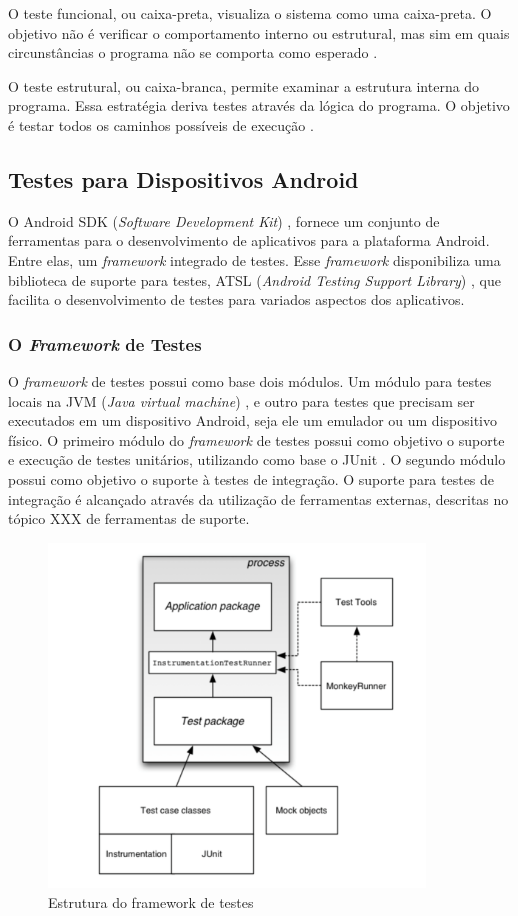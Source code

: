 O teste funcional, ou caixa-preta, visualiza o sistema como uma caixa-preta. O
objetivo não é verificar o comportamento interno ou estrutural, mas sim em
quais circunstâncias o programa não se comporta como esperado \cite{myers2011}.

O teste estrutural, ou caixa-branca, permite examinar a estrutura interna do
programa. Essa estratégia deriva testes através da lógica do programa. O
objetivo é testar todos os caminhos possíveis de execução \cite{myers2011}.

  \subsection{Testes para Dispositivos Android}

O Android SDK (\textit{Software Development Kit}) \cite{androidSdk}, fornece um
conjunto de ferramentas para o desenvolvimento de aplicativos para a plataforma
Android. Entre elas, um \textit{framework} integrado de testes. Esse
\textit{framework} disponibiliza uma biblioteca de suporte para testes, ATSL
(\textit{Android Testing Support Library}) \cite{atsl}, que facilita o
desenvolvimento de testes para variados aspectos dos aplicativos.

    \subsubsection{O \textit{Framework} de Testes}

O \textit{framework} de testes possui como base dois módulos. Um módulo para
testes locais na JVM (\textit{Java virtual machine}) \cite{java}, e outro para
testes que precisam ser executados em um dispositivo Android, seja ele um
emulador ou um dispositivo físico.
O primeiro módulo do \textit{framework} de testes possui como objetivo o
suporte e execução de testes unitários, utilizando como base o JUnit
\cite{junit2015}. O segundo módulo possui como objetivo o suporte à testes de
integração. O suporte para testes de integração é alcançado através da
utilização de ferramentas externas, descritas no tópico XXX de
ferramentas de suporte.

\begin{figure}[H]
  \centering
  \includegraphics[width=10cm]{figuras/android_test.png}
  \caption{Estrutura do framework de testes \cite{androidTesting2015}}
  \label{figura:testes}
\end{figure}

